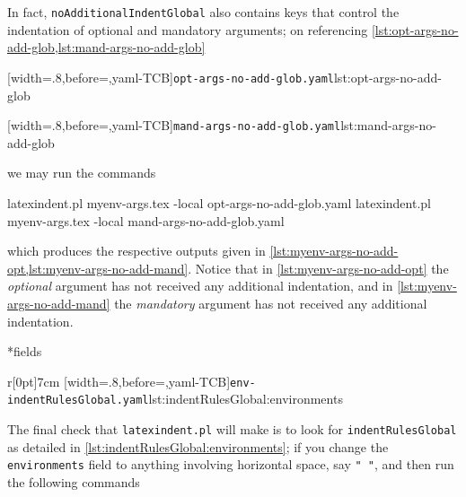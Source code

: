 	In fact, \texttt{noAdditionalIndentGlobal} also contains keys that control the indentation of optional and mandatory
	arguments; on referencing \cref{lst:opt-args-no-add-glob,lst:mand-args-no-add-glob}

	\begin{minipage}{.49\textwidth}
		[width=.8\linewidth,before=\centering,yaml-TCB]{\texttt{opt-args-no-add-glob.yaml}}{lst:opt-args-no-add-glob}
	\end{minipage}
	\hfill
	\begin{minipage}{.49\textwidth}
		[width=.8\linewidth,before=\centering,yaml-TCB]{\texttt{mand-args-no-add-glob.yaml}}{lst:mand-args-no-add-glob}
	\end{minipage}

	we may run the commands
	\begin{commandshell}
latexindent.pl  myenv-args.tex -local opt-args-no-add-glob.yaml
latexindent.pl  myenv-args.tex -local mand-args-no-add-glob.yaml
\end{commandshell}
	which produces the respective outputs given in \cref{lst:myenv-args-no-add-opt,lst:myenv-args-no-add-mand}. Notice that in \cref{lst:myenv-args-no-add-opt}
	the \emph{optional} argument has not received any additional indentation, and in \cref{lst:myenv-args-no-add-mand} the \emph{mandatory} argument
	has not received any additional indentation.

	\begin{minipage}{.45\textwidth}
	\end{minipage}
	\hfill
	\begin{minipage}{.45\textwidth}
	\end{minipage}

*{fields}
	\begin{wrapfigure}[4]{r}[0pt]{7cm}
		[width=.8\linewidth,before=\centering,yaml-TCB]{\texttt{env-indentRulesGlobal.yaml}}{lst:indentRulesGlobal:environments}
	\end{wrapfigure}
	The final check that \texttt{latexindent.pl} will make is to look for \texttt{indentRulesGlobal} as detailed in \cref{lst:indentRulesGlobal:environments}; if you change the \texttt{environments}
	field to anything involving horizontal space, say \lstinline!" "!, and then run the following commands

